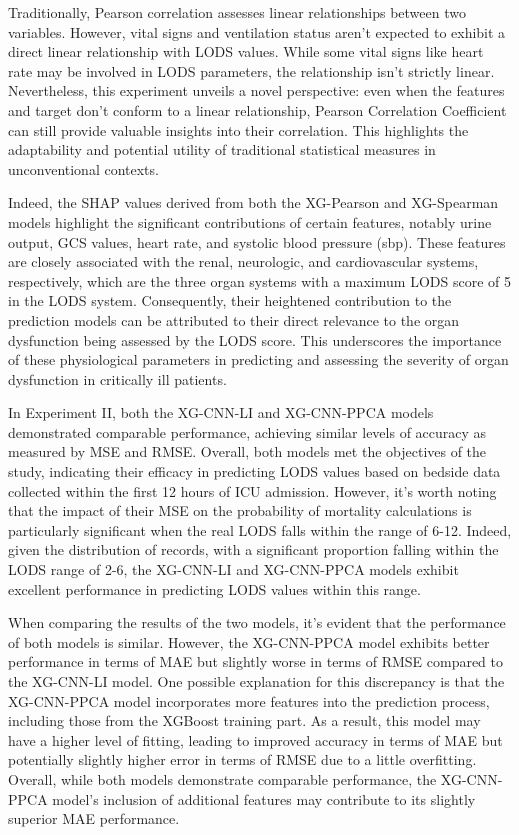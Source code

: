 \documentclass[12pt,a4paper,english
]{tunithesis}
\begin{document}
Traditionally, Pearson correlation assesses linear relationships between two variables. However, vital signs and ventilation status aren't expected to exhibit a direct linear relationship with LODS values. While some vital signs like heart rate may be involved in LODS parameters, the relationship isn't strictly linear. Nevertheless, this experiment unveils a novel perspective: even when the features and target don't conform to a linear relationship, Pearson Correlation Coefficient can still provide valuable insights into their correlation. This highlights the adaptability and potential utility of traditional statistical measures in unconventional contexts.

Indeed, the SHAP values derived from both the XG-Pearson and XG-Spearman models highlight the significant contributions of certain features, notably urine output, GCS values, heart rate, and systolic blood pressure (sbp). These features are closely associated with the renal, neurologic, and cardiovascular systems, respectively, which are the three organ systems with a maximum LODS score of 5 in the LODS system. Consequently, their heightened contribution to the prediction models can be attributed to their direct relevance to the organ dysfunction being assessed by the LODS score. This underscores the importance of these physiological parameters in predicting and assessing the severity of organ dysfunction in critically ill patients. 

In Experiment II, both the XG-CNN-LI and XG-CNN-PPCA models demonstrated comparable performance, achieving similar levels of accuracy as measured by MSE and RMSE. Overall, both models met the objectives of the study, indicating their efficacy in predicting LODS values based on bedside data collected within the first 12 hours of ICU admission. However, it's worth noting that the impact of their MSE on the probability of mortality calculations is particularly significant when the real LODS falls within the range of 6-12. Indeed, given the distribution of records, with a significant proportion falling within the LODS range of 2-6, the XG-CNN-LI and XG-CNN-PPCA models exhibit excellent performance in predicting LODS values within this range.

When comparing the results of the two models, it's evident that the performance of both models is similar. However, the XG-CNN-PPCA model exhibits better performance in terms of MAE but slightly worse in terms of RMSE compared to the XG-CNN-LI model. One possible explanation for this discrepancy is that the XG-CNN-PPCA model incorporates more features into the prediction process, including those from the XGBoost training part. As a result, this model may have a higher level of fitting, leading to improved accuracy in terms of MAE but potentially slightly higher error in terms of RMSE due to a little overfitting. Overall, while both models demonstrate comparable performance, the XG-CNN-PPCA model's inclusion of additional features may contribute to its slightly superior MAE performance.
\end{document}
